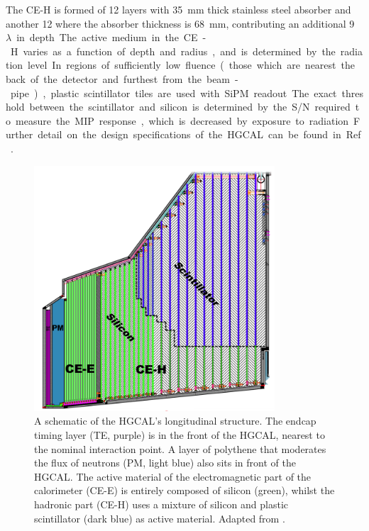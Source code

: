The CE-H is formed of 12 layers with \SI{35}{mm} thick stainless steel absorber and another 12 where the absorber thickness is \SI{68}{mm}, contributing an additional \SI{9}{$\lambda$} in depth.
The active medium in the CE-H varies as a function of depth and radius, and is determined by the radiation level.
In regions of sufficiently low fluence (those which are nearest the back of the detector and furthest from the beam-pipe), plastic scintillator tiles are used with SiPM readout.
The exact threshold between the scintillator and silicon is determined by the S/N required to measure the MIP response, which is decreased by exposure to radiation.
Further detail on the design specifications of the HGCAL can be found in Ref.~\cite{HGCAL}.

\begin{figure}[h!]
  \centering
  \includegraphics[width=0.8\textwidth]{Figures/HGCAL/TheHGCAL.png}
  \caption[Schematic of the HGCAL.]
  {
    A schematic of the HGCAL's longitudinal structure. 
    The endcap timing layer (TE, purple) is in the front of the HGCAL, 
    nearest to the nominal interaction point.
    A layer of polythene that moderates the flux of neutrons (PM, light blue) 
    also sits in front of the HGCAL.
    The active material of the electromagnetic part of the calorimeter (CE-E) 
    is entirely composed of silicon (green),
    whilst the hadronic part (CE-H) uses a mixture of silicon and plastic scintillator (dark blue)
    as active material.
    Adapted from \cite{HGCAL}.
  }
  \label{fig:hgcal_TheHGCAL}
\end{figure}

